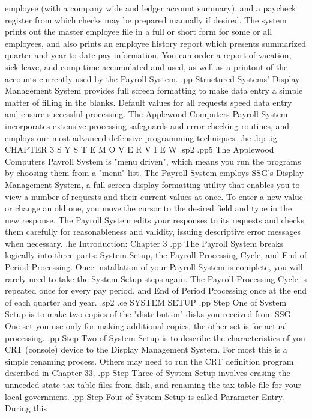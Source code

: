 employee (with a company wide and ledger account summary),
and a paycheck register from
which checks may be prepared manually if desired.  The system prints
out the master employee file in a full or short form for some
or all employees, and also prints an employee history report
which presents summarized quarter and year-to-date pay information.
You can order a report of vacation, sick leave, and comp time
accumulated and used, as well as
a printout of the accounts currently used by the Payroll System.
.pp
Structured Systems' Display Management System provides full screen
formatting to make data entry a simple matter of filling in the blanks.
Default values for all requests speed data entry and
ensure successful processing.  The Applewood Computers Payroll
System incorporates extensive processing safeguards and error
checking routines, and employs our most advanced defensive programming
techniques.
.he
.bp
.ig
CHAPTER 3
S Y S T E M    O V E R V I E W
.sp2
.pp5
The Applewood Computers Payroll System is "menu driven", which
means you run the programs by choosing them from a "menu" list.
The Payroll System employs SSG's Display Management System, a full-screen
display formatting utility that enables you to
view a number of requests and their current values at once.  To enter
a new value or change an old one, you move the cursor to the desired
field and type in the new response.  The Payroll System edits your
responses to its requests and checks them carefully for reasonableness
and validity, issuing descriptive error messages when necessary.
.he Introduction: Chapter 3
.pp
The Payroll System breaks logically into three parts: System Setup,
the Payroll Processing Cycle, and End of Period Processing.  Once
installation of your Payroll System is complete, you will rarely need
to take the System Setup steps again.  The Payroll
Processing Cycle is repeated once for every pay period, and End of Period
Processing once at the end of each quarter and year.
.sp2
.ce
SYSTEM SETUP
.pp
Step One of System Setup is to make two copies of the "distribution"
disks you received from SSG.  One set you use only for making
additional copies, the other set is for actual processing.
.pp
Step Two of System Setup is to describe the characteristics of you
CRT (console) device to the Display Management System.	For most
this is a simple renaming process. Others may need to run the
CRT definition program described in Chapter 33.
.pp
Step Three of System Setup involves erasing the unneeded state tax
table files from disk, and renaming the tax table file
for your local government.
.pp
Step Four of System Setup is called Parameter Entry.  During this
